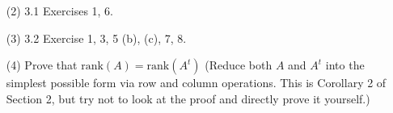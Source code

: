 \documentclass[11pt]{article}
\theoremstyle{plain}
\theoremstyle{definition}
\begin{document}
\begin{enumerate}
(b) Define $T(\beta):= (T(v_1),T(v_2),\dots, T(v_n))$, a row of vectors. Show that
\[
T(\beta)= (w_1,\dots, w_m)\cdot A.
\]
where $A= [T]_\beta^\gamma $ is the matrix of $T$ with respect to $\beta$ and $\gamma$.

(c) Now, if $\beta = \beta^\prime \cdot Q_1$ and $\gamma = \gamma^\prime \cdot Q_2$ where 
$Q_1=[\mathrm{Id}_V]_\beta^{\beta^\prime}$ and $Q_2=[\mathrm{Id}_W]_\gamma^{\gamma^\prime}$ are the respective change of coordinate matrices, we then have
\[
T(\beta) = T(\beta^\prime \cdot Q_1)= T(\beta^\prime) \cdot Q_1
\]
since $T$ is linear. Combine this with part (b) and show that
\[
A^\prime = Q_2^{-1} A Q_1,
\]
where $A^\prime = [T]_{\beta^\prime}^{\gamma^\prime}$.
\item[(2)] 3.1 Exercises 1, 6.
\item[(3)] 3.2 Exercise 1, 3, 5 (b), (c), 7, 8.
\item[(4)] Prove that $\mathrm{rank}(A)=\mathrm{rank}(A^t)$ (Reduce both $A$ and $A^t$ into the simplest possible form via row and column operations. This is Corollary 2 of Section 2, but try not to look at the proof and directly prove it yourself.)
\end{enumerate}
\end{document}
